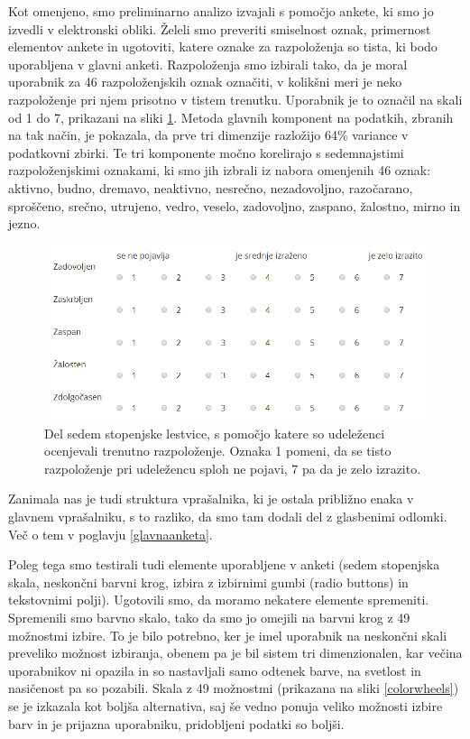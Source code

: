 \documentclass[a4paper, 12pt]{book}
\begin{document}
{Kot omenjeno, smo preliminarno analizo izvajali s pomočjo ankete, ki smo jo izvedli v elektronski obliki. Želeli smo preveriti smiselnost oznak, primernost elementov ankete in ugotoviti, katere oznake za razpoloženja so tista, ki bodo uporabljena v glavni anketi. Razpoloženja smo izbirali tako, da je moral uporabnik za 46 razpoloženjskih oznak označiti, v kolikšni meri je neko razpoloženje pri njem prisotno v tistem trenutku. Uporabnik je to označil na skali od 1 do 7, prikazani na sliki \ref{skala}. Metoda glavnih komponent na podatkih, zbranih na tak način, je pokazala, da prve tri dimenzije razložijo 64\% variance v podatkovni zbirki. Te tri komponente močno korelirajo s sedemnajstimi razpoloženjskimi oznakami, ki smo jih izbrali iz nabora omenjenih 46 oznak: aktivno, budno, dremavo, neaktivno, nesrečno, nezadovoljno, razočarano, sproščeno, srečno, utrujeno, vedro, veselo, zadovoljno, zaspano, žalostno, mirno in jezno.

\begin{figure}[htb]
\centering
\includegraphics[width=13cm]{images/likart.png}

\caption{Del sedem stopenjske lestvice, s pomočjo katere so udeleženci ocenjevali trenutno razpoloženje. Oznaka 1 pomeni, da se tisto razpoloženje pri udeležencu sploh ne pojavi, 7 pa da je zelo izrazito. }
\label{skala}
\end{figure}

Zanimala nas je tudi struktura vprašalnika, ki je ostala približno enaka v glavnem vprašalniku, s to razliko, da smo tam dodali del z glasbenimi odlomki. Več o tem v poglavju \ref{glavnaanketa}.

Poleg tega smo testirali tudi elemente uporabljene v anketi (sedem stopenjska skala, neskončni barvni krog, izbira z izbirnimi gumbi (radio buttons) in tekstovnimi polji). Ugotovili smo, da moramo nekatere elemente spremeniti. Spremenili smo barvno skalo, tako da smo jo omejili na barvni krog z 49 možnostmi izbire. To je bilo potrebno, ker je imel uporabnik na neskončni skali preveliko možnost izbiranja, obenem pa je bil sistem tri dimenzionalen, kar večina uporabnikov ni opazila in so nastavljali samo odtenek barve, na svetlost in nasičenost pa so pozabili. Skala z 49 možnostmi (prikazana na sliki \ref{colorwheels}) se je izkazala kot boljša alternativa, saj še vedno ponuja veliko možnosti izbire barv in je prijazna uporabniku, pridobljeni podatki so boljši.

}
\end{document}

